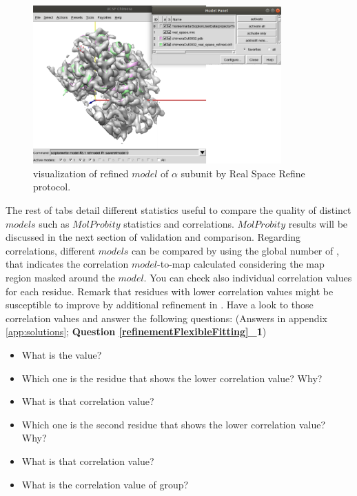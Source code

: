  \begin{figure}[H]
  \centering 
  \captionsetup{width=.7\linewidth} 
  \includegraphics[width=0.85\textwidth]{Images/Fig30}
  \caption{\chimera visualization of refined $model$ of  $\alpha$ subunit by \phenix Real Space Refine protocol.}
  \label{fig:phenix_real_space_refine_chimera}
  \end{figure}
  
  The rest of tabs detail different statistics useful to compare the quality of distinct $models$ such as $MolProbity$ statistics and  correlations. $MolProbity$ results will be discussed in the next section of validation and comparison. Regarding  correlations, different $models$ can be compared by using the global number of \ccmask, that indicates the correlation $model$-to-map calculated considering the map region masked around the $model$. You can check also individual correlation values for each residue.  Remark that residues with lower correlation values might be susceptible to improve by additional refinement in \coot. Have a look to those correlation values and answer the following questions: (Answers in appendix \ref{app:solutions}; \textbf{Question \ref{refinementFlexibleFitting}\_1}) \\
  
  \begin{minipage}{\linewidth}
  \begin{framed}
  \begin{itemize}
  \item What is the \ccmask value?
  \item Which one is the residue that shows the lower correlation value? Why?
  \item What is that correlation value?
  \item Which one is the second residue that shows the lower correlation value? Why?
  \item What is that correlation value?
  \item What is the correlation value of  group?
  \end{itemize}
  \end{framed}
  \end{minipage}\\
  

